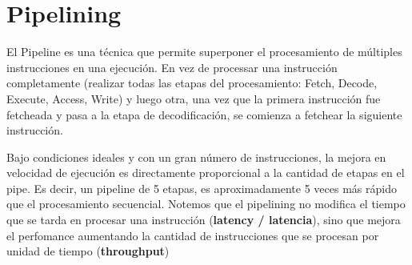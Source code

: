 %
%
%
%
%

\newpage
\section{Pipelining}
El Pipeline es una técnica que permite superponer el procesamiento de múltiples instrucciones en una ejecución. En vez de processar una instrucción completamente (realizar todas las etapas del procesamiento: Fetch, Decode, Execute, Access, Write) y luego otra,  una vez que la primera instrucción fue fetcheada y pasa a la etapa de decodificación, se comienza a fetchear la siguiente instrucción. 

Bajo condiciones ideales y con un gran número de instrucciones, la mejora en velocidad de ejecución es directamente proporcional a la cantidad de etapas en el pipe. Es decir, un pipeline de 5 etapas, es aproximadamente 5 veces más rápido que el procesamiento secuencial.  Notemos que el pipelining no modifica el tiempo que se tarda en procesar una instrucción (\textbf{latency / latencia}), sino que mejora el perfomance aumentando la cantidad de instrucciones que se procesan por unidad de tiempo (\textbf{throughput})

